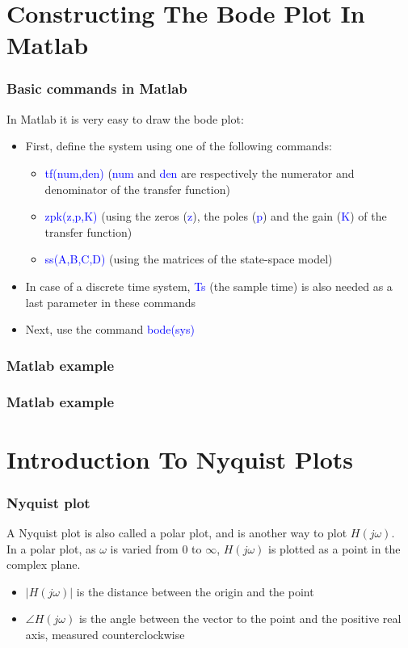\section{Constructing The Bode Plot In Matlab}

\begin{frame}
\frametitle{Basic commands in Matlab}

In Matlab it is very easy to draw the bode plot:
\begin{itemize}
\item First, define the system using one of the following commands:
	\begin{itemize}
	\item \textcolor{blue}{tf(num,den)} (\textcolor{blue}{num} and \textcolor{blue}{den} are respectively the numerator and denominator of the transfer function)
	\item \textcolor{blue}{zpk(z,p,K)} (using the zeros (\textcolor{blue}{z}), the poles (\textcolor{blue}{p}) and the gain (\textcolor{blue}{K}) of the transfer function)
	\item \textcolor{blue}{ss(A,B,C,D)} (using the matrices of the state-space model)

	\end{itemize}
\item In case of a discrete time system, \textcolor{blue}{Ts} (the sample time) is also needed as a last parameter in these commands
\item Next, use the command \textcolor{blue}{bode(sys)}

\end{itemize}

\end{frame}

\begin{frame}
\frametitle{Matlab example}

\end{frame}

\begin{frame}
\frametitle{Matlab example}

\end{frame}


\section{Introduction To Nyquist Plots}
\begin{frame}
\frametitle{Nyquist plot}
A Nyquist plot is also called a polar plot, and is another way to plot $H(j\omega)$.\\
In a polar plot, as $\omega$ is varied from 0 to $\infty$, $H(j\omega)$ is plotted as a point in the complex plane.
\begin{itemize}
\item $|H(j\omega)|$ is the distance between the origin and the point
\item $\angle H(j\omega)$ is the angle between the vector to the point and the positive real axis, measured counterclockwise 
\end{itemize}

\end{frame}

